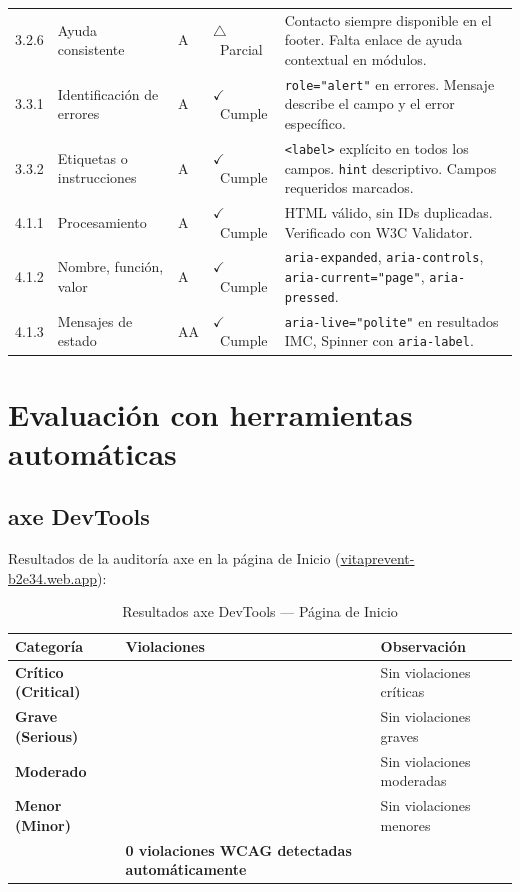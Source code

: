 \documentclass[12pt, a4paper]{report}
\newcommand{\cmark}{\textcolor{successgreen}{$\checkmark$}}
\newcommand{\wmark}{\textcolor{warningyellow}{$\triangle$}}
\begin{document}
\begin{longtable}{@{}>{\ttfamily\small}p{1.1cm} p{2.7cm} >{\centering\arraybackslash}p{0.8cm} >{\centering\arraybackslash\small}p{2.2cm} p{4.5cm}@{}}
3.2.6 & Ayuda consistente & A & \textcolor{warningyellow}{\wmark~Parcial} & Contacto siempre disponible en el footer. Falta enlace de ayuda contextual en módulos. \\
3.3.1 & Identificación de errores & A & \textcolor{successgreen}{\cmark~Cumple} & \texttt{role="alert"} en errores. Mensaje describe el campo y el error específico. \\
3.3.2 & Etiquetas o instrucciones & A & \textcolor{successgreen}{\cmark~Cumple} & \texttt{<label>} explícito en todos los campos. \texttt{hint} descriptivo. Campos requeridos marcados. \\
4.1.1 & Procesamiento & A & \textcolor{successgreen}{\cmark~Cumple} & HTML válido, sin IDs duplicadas. Verificado con W3C Validator. \\
4.1.2 & Nombre, función, valor & A & \textcolor{successgreen}{\cmark~Cumple} & \texttt{aria-expanded}, \texttt{aria-controls}, \texttt{aria-current="page"}, \texttt{aria-pressed}. \\
4.1.3 & Mensajes de estado & AA & \textcolor{successgreen}{\cmark~Cumple} & \texttt{aria-live="polite"} en resultados IMC, Spinner con \texttt{aria-label}. \\

\end{longtable}

\section{Evaluación con herramientas automáticas}

\subsection{axe DevTools}

Resultados de la auditoría axe en la página de Inicio (\url{vitaprevent-b2e34.web.app}):

\begin{table}[H]
\centering
\caption{Resultados axe DevTools --- Página de Inicio}
\label{tab:axe}
\begin{tabular}{@{}>{\bfseries}p{3cm} >{\centering\arraybackslash}p{2.5cm} p{8cm}@{}}
\toprule
\rowcolor{royalblue!12}
\textbf{Categoría} & \textbf{Violaciones} & \textbf{Observación} \\
\midrule
Crítico (Critical) & 0 & Sin violaciones críticas \\
Grave (Serious) & 0 & Sin violaciones graves \\
Moderado & 0 & Sin violaciones moderadas \\
Menor (Minor) & 0 & Sin violaciones menores \\
\midrule
\multicolumn{2}{@{}>{\bfseries}l}{Resultado} & \textcolor{successgreen}{\textbf{0 violaciones WCAG detectadas automáticamente}} \\
\bottomrule
\end{tabular}
\end{table}
\end{document}
